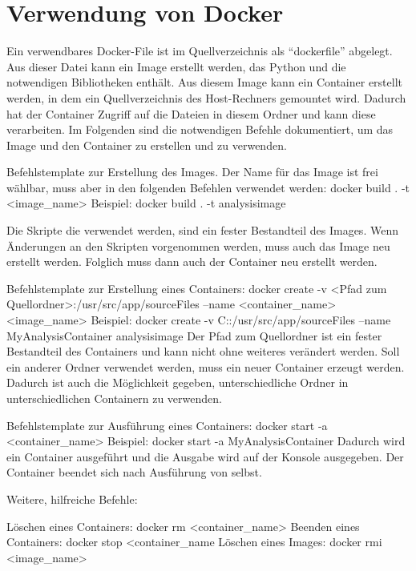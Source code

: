 \section{Verwendung von Docker}
\label{docker:examples}

Ein verwendbares Docker-File ist im Quellverzeichnis als \enquote{dockerfile} abgelegt.
Aus dieser Datei kann ein Image erstellt werden, das Python und die notwendigen Bibliotheken enthält.
Aus diesem Image kann ein Container erstellt werden, in dem ein Quellverzeichnis des Host-Rechners gemountet wird.
Dadurch hat der Container Zugriff auf die Dateien in diesem Ordner und kann diese verarbeiten.
Im Folgenden sind die notwendigen Befehle dokumentiert, um das Image und den Container zu erstellen und zu verwenden.
{}{}
	
\begin{DockerCommands}
Befehlstemplate zur Erstellung des Images. Der Name für das Image ist frei wählbar,
muss aber in den folgenden Befehlen verwendet werden:
	docker build . -t <image_name>
Beispiel:
	docker build . -t analysisimage
	
Die Skripte die verwendet werden, sind ein fester Bestandteil des Images.
Wenn Änderungen an den Skripten vorgenommen werden, muss auch das Image neu erstellt
werden.
Folglich muss dann auch der Container neu erstellt werden.
		
Befehlstemplate zur Erstellung eines Containers:
	docker create  -v <Pfad zum Quellordner>:/usr/src/app/sourceFiles  --name <container_name>  <image_name>
Beispiel:	
	docker create  -v C:\Temp\sourcefiles:/usr/src/app/sourceFiles  --name MyAnalysisContainer  analysisimage
Der Pfad zum Quellordner ist ein fester Bestandteil des Containers und kann nicht
ohne weiteres verändert werden.
Soll ein anderer Ordner verwendet werden, muss ein neuer Container erzeugt werden.
Dadurch ist auch die Möglichkeit gegeben, unterschiedliche Ordner in 
unterschiedlichen Containern zu verwenden.

Befehlstemplate zur Ausführung eines Containers:
	docker start -a <container_name>
Beispiel:
	docker start -a MyAnalysisContainer
Dadurch wird ein Container ausgeführt und die Ausgabe wird auf der Konsole 
ausgegeben. Der Container beendet sich nach Ausführung von selbst.



Weitere, hilfreiche Befehle:

Löschen eines Containers:
	docker rm <container_name>
Beenden eines Containers:
	docker stop <container_name
Löschen eines Images:
	docker rmi <image_name>
\end{DockerCommands}